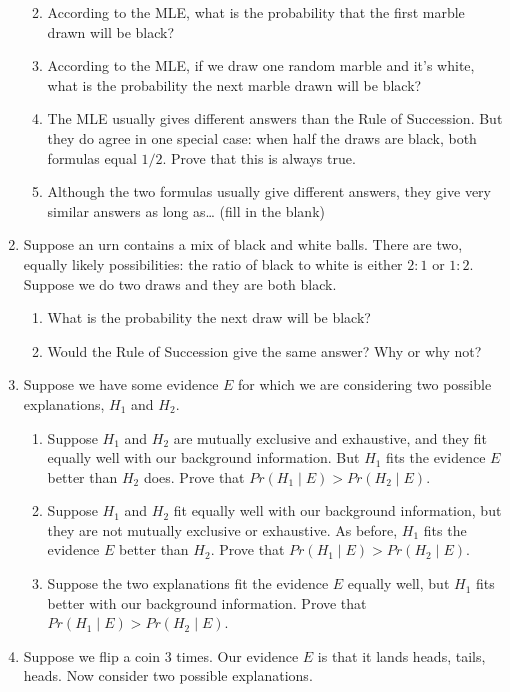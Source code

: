 \documentclass[justified]{tufte-book}
\providecommand{\tightlist}{%
  \setlength{\itemsep}{0pt}\setlength{\parskip}{0pt}}
\newcommand{\given}{\mid}
\newcommand{\p}{Pr}
\theoremstyle{definition}
\theoremstyle{definition}
\theoremstyle{definition}
\theoremstyle{definition}
\theoremstyle{remark}
\begin{document}
\begin{enumerate}
  \begin{enumerate}
  \def\labelenumii{\alph{enumii}.}
  \tightlist
  \item
    According to the MLE, what is the probability that the first marble drawn will be black?
  \item
    According to the MLE, if we draw one random marble and it's white, what is the probability the next marble drawn will be black?
  \item
    The MLE usually gives different answers than the Rule of Succession. But they do agree in one special case: when half the draws are black, both formulas equal \(1/2\). Prove that this is always true.
  \item
    Although the two formulas usually give different answers, they give very similar answers as long as\ldots{} (fill in the blank)
  \end{enumerate}
\item
  Suppose an urn contains a mix of black and white balls. There are two, equally likely possibilities: the ratio of black to white is either \(2:1\) or \(1:2\). Suppose we do two draws and they are both black.

  \begin{enumerate}
  \def\labelenumii{\alph{enumii}.}
  \tightlist
  \item
    What is the probability the next draw will be black?
  \item
    Would the Rule of Succession give the same answer? Why or why not?
  \end{enumerate}
\item
  Suppose we have some evidence \(E\) for which we are considering two possible explanations, \(H_1\) and \(H_2\).

  \begin{enumerate}
  \def\labelenumii{\alph{enumii}.}
  \tightlist
  \item
    Suppose \(H_1\) and \(H_2\) are mutually exclusive and exhaustive, and they fit equally well with our background information. But \(H_1\) fits the evidence \(E\) better than \(H_2\) does. Prove that \(\p(H_1 \given E) > \p(H_2 \given E)\).
  \item
    Suppose \(H_1\) and \(H_2\) fit equally well with our background information, but they are not mutually exclusive or exhaustive. As before, \(H_1\) fits the evidence \(E\) better than \(H_2\). Prove that \(\p(H_1 \given E) > \p(H_2 \given E)\).
  \item
    Suppose the two explanations fit the evidence \(E\) equally well, but \(H_1\) fits better with our background information. Prove that \(\p(H_1 \given E) > \p(H_2 \given E)\).
  \end{enumerate}
\item
  Suppose we flip a coin \(3\) times. Our evidence \(E\) is that it lands heads, tails, heads. Now consider two possible explanations.


\end{enumerate}
\end{document}
